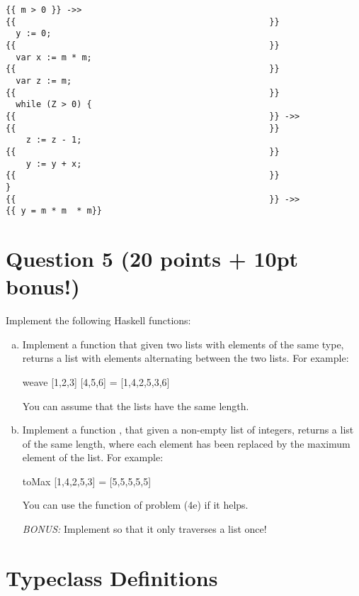 \documentclass{article}
\begin{document}
\begin{verbatim}
{{ m > 0 }} ->> 
{{                                                  }}
  y := 0;
{{                                                  }}
  var x := m * m;
{{                                                  }}
  var z := m;
{{                                                  }}
  while (Z > 0) {
{{                                                  }} ->>
{{                                                  }}
    z := z - 1;
{{                                                  }}
    y := y + x;
{{                                                  }} 
}
{{                                                  }} ->>
{{ y = m * m  * m}}
\end{verbatim}


\pagebreak
\section*{Question 5 (20 points + 10pt bonus!)}

Implement the following Haskell functions:

\begin{enumerate}[(a)]
\item Implement a function  that given two lists with
  elements of the same type, returns a list with elements alternating
  between the two lists. For example:
  \begin{hask}
    weave [1,2,3] [4,5,6] = [1,4,2,5,3,6]
  \end{hask}
  You can assume that the lists have the same length.
  \vspace*{20em}
  
\item Implement a function , that given a non-empty
  list of integers, returns a list of the same length, where
  each element has been replaced by the maximum element of the
  list. For example:
  \begin{hask}
    toMax [1,4,2,5,3] = [5,5,5,5,5]
  \end{hask}
  You can use the  function of problem (4e) if it helps.
 
  {\em BONUS: } Implement  so that it only traverses
  a list once!
% 
\end{enumerate}

\pagebreak

\section*{Typeclass Definitions}
\end{document}
